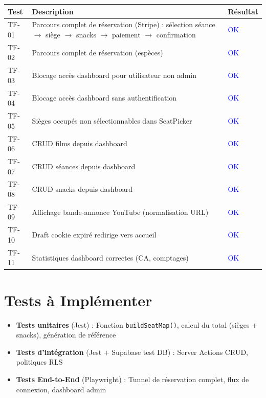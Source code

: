 \documentclass[12pt,a4paper,openany]{report}
\begin{document}
\begin{longtable}{lp{7cm}l}
  \toprule
  \textbf{Test} & \textbf{Description} & \textbf{Résultat} \\
  \midrule
  \endhead
  \bottomrule
  \endfoot
  TF-01 & Parcours complet de réservation (Stripe) : sélection séance $\rightarrow$ siège $\rightarrow$ snacks $\rightarrow$ paiement $\rightarrow$ confirmation & \textcolor{blue}{OK} \\
  TF-02 & Parcours complet de réservation (espèces) & \textcolor{blue}{OK} \\
  TF-03 & Blocage accès dashboard pour utilisateur non admin & \textcolor{blue}{OK} \\
  TF-04 & Blocage accès dashboard sans authentification & \textcolor{blue}{OK} \\
  TF-05 & Sièges occupés non sélectionnables dans SeatPicker & \textcolor{blue}{OK} \\
  TF-06 & CRUD films depuis dashboard & \textcolor{blue}{OK} \\
  TF-07 & CRUD séances depuis dashboard & \textcolor{blue}{OK} \\
  TF-08 & CRUD snacks depuis dashboard & \textcolor{blue}{OK} \\
  TF-09 & Affichage bande-annonce YouTube (normalisation URL) & \textcolor{blue}{OK} \\
  TF-10 & Draft cookie expiré redirige vers accueil & \textcolor{blue}{OK} \\
  TF-11 & Statistiques dashboard correctes (CA, comptages) & \textcolor{blue}{OK} \\
\end{longtable}

\section{Tests à Implémenter}

\begin{itemize}
  \item \textbf{Tests unitaires} (Jest) : Fonction \texttt{buildSeatMap()}, calcul du total (sièges + snacks), génération de référence
  \item \textbf{Tests d'intégration} (Jest + Supabase test DB) : Server Actions CRUD, politiques RLS
  \item \textbf{Tests End-to-End} (Playwright) : Tunnel de réservation complet, flux de connexion, dashboard admin
\end{itemize}

\end{document}
